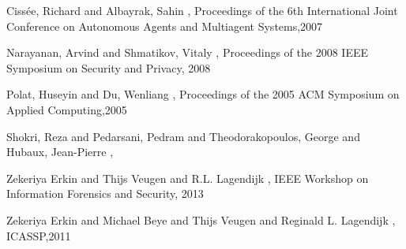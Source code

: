 \documentclass[twocolumn]{phdsymp} %
\begin{document}
%
\begin{thebibliography}{1}

Ciss{\'e}e, Richard and Albayrak, Sahin
,
\newblock Proceedings of the 6th International Joint Conference on Autonomous Agents and Multiagent Systems,2007

Narayanan, Arvind and Shmatikov, Vitaly
,
\newblock Proceedings of the 2008 IEEE Symposium on Security and Privacy, 2008

Polat, Huseyin and Du, Wenliang
,
\newblock Proceedings of the 2005 ACM Symposium on Applied Computing,2005


Shokri, Reza and Pedarsani, Pedram and Theodorakopoulos, George and Hubaux, Jean-Pierre
,

Zekeriya Erkin and Thijs Veugen and R.L. Lagendijk
,
\newblock IEEE Workshop on Information Forensics and Security, 2013

Zekeriya Erkin and Michael Beye and Thijs Veugen and Reginald L. Lagendijk
,
\newblock ICASSP,2011


\end{thebibliography}
%
\end{document}
